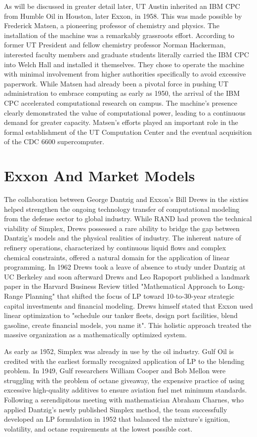 As will be discussed in greater detail later, UT Austin inherited an IBM CPC from Humble Oil in Houston, later Exxon, in 1958. This was made possible by Frederick Matsen, a pioneering professor of chemistry and physics. The installation of the machine was a remarkably grassroots effort. According to former UT President and fellow chemistry professor Norman Hackerman, interested faculty members and graduate students literally carried the IBM CPC into Welch Hall and installed it themselves. They chose to operate the machine with minimal involvement from higher authorities specifically to avoid excessive paperwork. While Matsen had already been a pivotal force in pushing UT administration to embrace computing as early as 1950, the arrival of the IBM CPC accelerated computational research on campus. The machine's presence clearly demonstrated the value of computational power, leading to a continuous demand for greater capacity. Matsen's efforts played an important role in the formal establishment of the UT Computation Center and the eventual acquisition of the CDC 6600 supercomputer.

\section{Exxon And Market Models}

The collaboration between George Dantzig and Exxon’s Bill Drews in the sixties helped strengthen the ongoing technology transfer of computational modeling from the defense sector to global industry. While RAND had proven the technical viability of Simplex, Drews possessed a rare ability to bridge the gap between Dantzig’s models and the physical realities of industry. The inherent nature of refinery operations, characterized by continuous liquid flows and complex chemical constraints, offered a natural domain for the application of linear programming. In 1962 Drews took a leave of absence to study under Dantzig at UC Berkeley and soon afterward Drews and Leo Rapoport published a landmark paper in the Harvard Business Review titled "Mathematical Approach to Long-Range Planning" that shifted the focus of LP toward 10-to-30-year strategic capital investments and financial modeling. Drews himself stated that Exxon used linear optimization to "schedule our tanker fleets, design port facilities, blend gasoline, create financial models, you name it". This holistic approach treated the massive organization as a mathematically optimized system.

As early as 1952, Simplex was already in use by the oil industry. Gulf Oil is credited with the earliest formally recognized application of LP to the blending problem. In 1949, Gulf researchers William Cooper and Bob Mellon were struggling with the problem of octane giveaway, the expensive practice of using excessive high-quality additives to ensure aviation fuel met minimum standards. Following a serendipitous meeting with mathematician Abraham Charnes, who applied Dantzig’s newly published Simplex method, the team successfully developed an LP formulation in 1952 that balanced the mixture's ignition, volatility, and octane requirements at the lowest possible cost.

